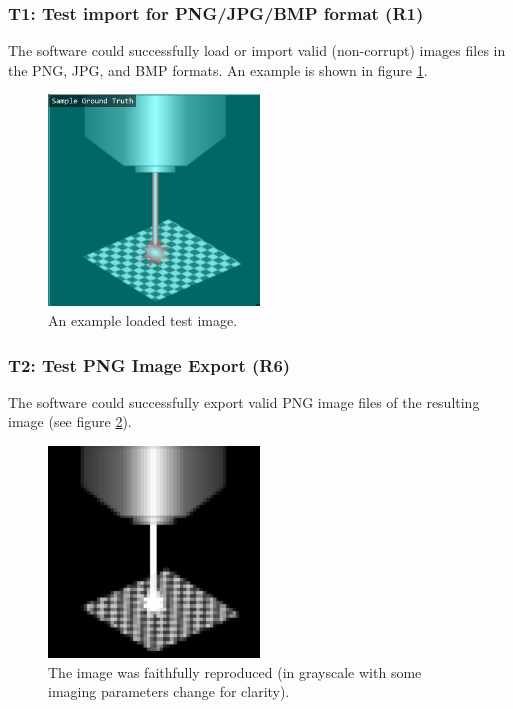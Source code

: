 \documentclass[12pt, titlepage]{article}
\begin{document}
\subsubsection{T1: Test import for PNG/JPG/BMP format (R1)}
The software could successfully load or import valid (non-corrupt) images files in the PNG, JPG, and BMP formats.
An example is shown in figure \ref{fig_t1}.
\begin{figure}[h!]
  \begin{center}
   \includegraphics[width=0.5\textwidth]{t1.png}
  \caption{An example loaded test image.}
  \label{fig_t1}
  \end{center}
\end{figure}


\subsubsection{T2: Test PNG Image Export (R6)}
The software could successfully export valid PNG image files of the resulting image (see figure \ref{fig_t2}).
\begin{figure}[h!]
  \begin{center}
   \includegraphics[width=0.5\textwidth]{t2.png}
  \caption{The image was faithfully reproduced (in grayscale with some imaging parameters change for clarity).}
  \label{fig_t2}
  \end{center}
\end{figure}
\end{document}
